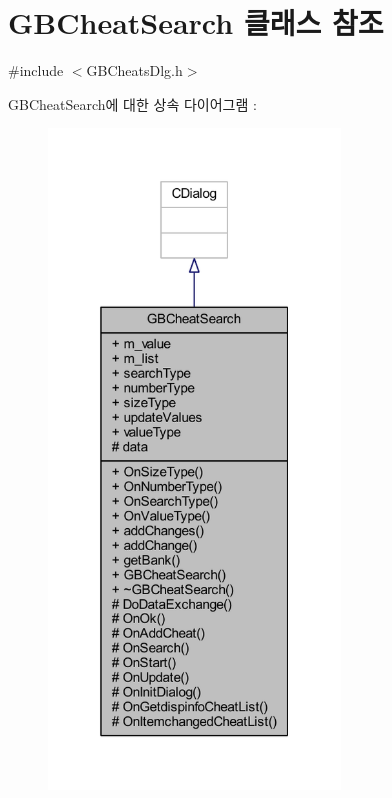 \hypertarget{class_g_b_cheat_search}{}\section{G\+B\+Cheat\+Search 클래스 참조}
\label{class_g_b_cheat_search}


{\ttfamily \#include $<$G\+B\+Cheats\+Dlg.\+h$>$}



G\+B\+Cheat\+Search에 대한 상속 다이어그램 \+: \nopagebreak
\begin{figure}[H]
\begin{center}
\leavevmode
\includegraphics[width=220pt]{class_g_b_cheat_search__inherit__graph}
\end{center}
\end{figure}


